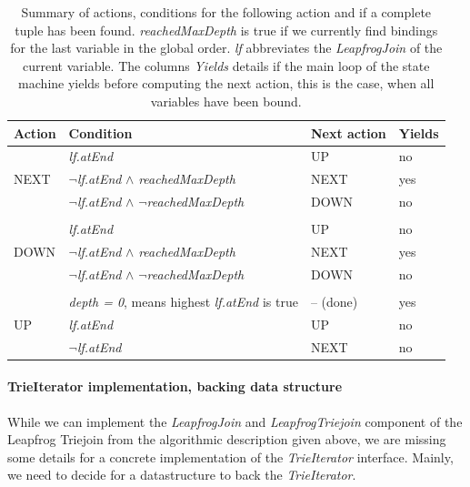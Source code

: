 \begin{table}[]
    \centering
    \begin{tabular}{@{}llll@{}}
        \toprule
        Action                & Condition                                  & Next action & Yields \\ \midrule
        \multirow{3}{*}{NEXT} & \textit{lf.atEnd}                                   & UP          & no     \\
        & \textit{$\neg$lf.atEnd} $\wedge$ \textit{reachedMaxDepth}             & NEXT        & yes    \\
        & \textit{$\neg$lf.atEnd} $\wedge$ \textit{$\neg$reachedMaxDepth}            & DOWN        & no     \\
        & & &\\
        \multirow{3}{*}{DOWN} & \textit{lf.atEnd}                                   & UP          & no     \\
        & \textit{$\neg$lf.atEnd} $\wedge$ \textit{reachedMaxDepth}             & NEXT        & yes    \\
        & \textit{$\neg$lf.atEnd} $\wedge$ \textit{$\neg$reachedMaxDepth}            & DOWN        & no     \\
        & & &\\
        \multirow{3}{*}{UP}     & \textit{depth = 0}, means highest \textit{lf.atEnd} is true & -- (done)         & yes    \\
        & \textit{lf.atEnd}                                   & UP          & no     \\
        & \textit{$\neg$lf.atEnd}                                  & NEXT        & no     \\ \bottomrule
    \end{tabular}
    \caption{Summary of actions, conditions for the following action and if a complete tuple has been found.
    \textit{reachedMaxDepth} is true if we currently find bindings for the last variable in the global order.
    \textit{lf} abbreviates the \textit{LeapfrogJoin} of the current variable.
    The columns \textit{Yields} details if the main loop of the state machine yields before computing the next action,
    this is the case, when all variables have been bound.
    }
    \label{table:lftj-state-machine}
\end{table}

\paragraph{TrieIterator implementation, backing data structure}
While we can implement the \textit{LeapfrogJoin} and \textit{LeapfrogTriejoin} component of the Leapfrog Triejoin from the
algorithmic description given above, we are missing some details for a concrete implementation of the
\textit{TrieIterator} interface.
Mainly, we need to decide for a datastructure to back the \textit{TrieIterator}.

